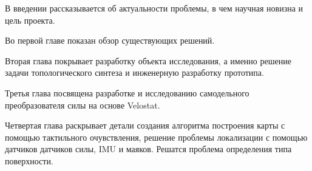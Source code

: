 {\struct}
В введении рассказывается об актуальности проблемы, в чем научная новизна и цель проекта.

Во первой главе показан обзор существующих решений.

Вторая глава покрывает разработку объекта исследования, а именно решение задачи топологического синтеза и инженерную разработку прототипа.

Третья глава посвящена разработке и исследованию самодельного преобразователя силы на основе Velostat.

Четвертая глава раскрывает детали создания алгоритма построения карты с помощью тактильного очувствления, решение проблемы локализации с помощью датчиков датчиков силы, IMU и маяков. Решатся проблема определения типа поверхности.